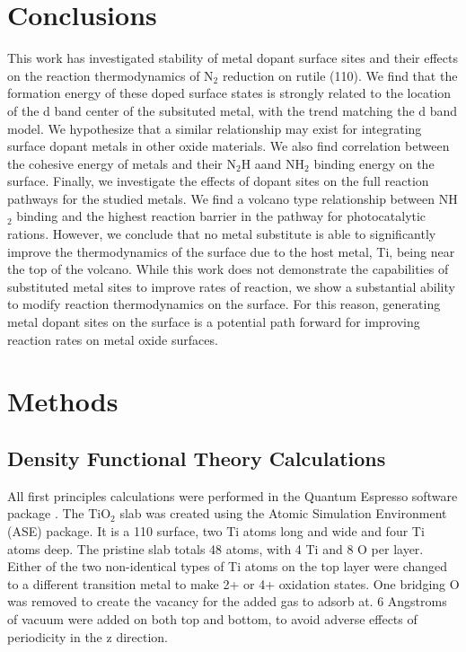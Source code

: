 \documentclass[catalysts,article,submit,moreauthors,pdftex,10pt,a4paper]{mdpi}
\theoremstyle{mdpi}
\newcounter{ex}
\newcounter{re}
\theoremstyle{mdpidefinition}
\begin{document}
\section{Conclusions}
This work has investigated stability of metal dopant surface sites and their effects on the reaction thermodynamics of N$_2$ reduction on rutile (110). We find that the formation energy of these doped surface states is strongly related to the location of the d band center of the subsituted metal, with the trend matching the d band model. We hypothesize that a similar relationship may exist for integrating surface dopant metals in other oxide materials. We also find correlation between the cohesive energy of metals and their N$_2$H aand NH$_2$ binding energy on the surface. Finally, we investigate the effects of dopant sites on the full reaction pathways for the studied metals. We find a volcano type relationship between NH$_2$ binding and the highest reaction barrier in the pathway for photocatalytic rations. However, we conclude that no metal substitute is able to significantly improve the thermodynamics of the surface due to the host metal, Ti, being near the top of the volcano. While this work does not demonstrate the capabilities of substituted metal sites to improve rates of reaction, we show a substantial ability to modify reaction thermodynamics on the surface. For this reason, generating metal dopant sites on the surface is a potential path forward for improving reaction rates on metal oxide surfaces.


\section{Methods}
\subsection{Density Functional Theory Calculations}
All first principles calculations were performed in the Quantum Espresso software package \cite{QE-2009}.
The TiO$_2$ slab was created using the Atomic Simulation Environment (ASE) package. It is a 110 surface, two Ti atoms long and wide and four Ti atoms deep. The pristine slab totals 48 atoms, with 4 Ti and 8 O per layer. Either of the two non-identical types of Ti atoms on the top layer were changed to a different transition metal to make 2+ or 4+ oxidation states. One bridging O was removed to create the vacancy for the added gas to adsorb at. 6 Angstroms of vacuum were added on both top and bottom, to avoid adverse effects of periodicity in the z direction.
\end{document}
